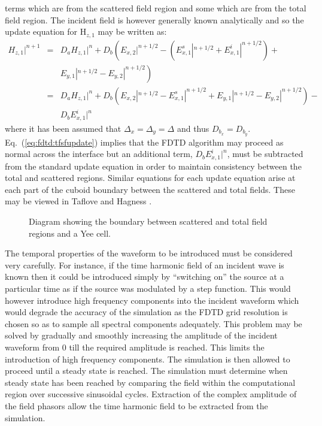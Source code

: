 \documentclass[a4paper, 12pt]{article}
\newcommand{\eq}[1]{Eq.\ (\ref{#1})}
\begin{document}
	terms which are from the scattered field region and some which are
	from the total field region. The incident field is however generally
	known analytically and so the update equation for H$_{z,1}$ may be
	written as:
	\begin{eqnarray}
		H_{z,1}|^{n+1}&=& D_aH_{z,1}|^n+D_b\left(E_{x,2}|^{n+1/2} -
		\left(E_{x,1}^s|^{n+1/2}+E_{x,1}^i|^{n+1/2}\right) + \nonumber\right.\\&&\left.E_{y,1}|^{n+1/2}
		- E_{y,2}|^{n+1/2}\right)\nonumber\\
		&=&D_a H_{z,1}|^n+D_b\left(E_{x,2}|^{n+1/2} -
		E_{x,1}^s|^{n+1/2} + E_{y,1}|^{n+1/2}
		- E_{y,2}|^{n+1/2}\right)-\nonumber\\&&D_bE^i_{x,1}|^n\label{eq:fdtd:tfsfupdate}
	\end{eqnarray}
	where it has been assumed that $\Delta_x=\Delta_y=\Delta$ and thus
	$D_{b_x}=D_{b_y}$. \eq{eq:fdtd:tfsfupdate} implies that the FDTD algorithm may proceed as normal across the
	interface but an additional term, $D_bE^i_{x,1}|^n$, must be
	subtracted from the standard update equation in order to maintain
	consistency between the total and scattered regions. Similar equations
	for each update equation arise at each part of the cuboid boundary
	between the scattered and total fields. These may be viewed in Taflove
	and Hagness \cite{taflove00book}.
	\begin{figure}[!h]
		\centering
		\caption{Diagram showing the boundary between scattered and total
			field regions and a Yee cell.}
		\label{fig:fdtd:tfsfeg}
	\end{figure}
	
	The temporal properties of the waveform to be introduced must be
	considered very carefully. For instance, if the time harmonic field of
	an incident wave is known then it could be introduced simply by
	``switching on'' the source at a particular time as if the source was
	modulated by a step function. This would however introduce high
	frequency components into the incident waveform which would degrade
	the accuracy of the simulation as the FDTD grid resolution is chosen
	so as to sample all spectral components adequately. This problem may
	be solved by gradually and smoothly increasing the amplitude of the
	incident waveform from 0 till the required amplitude is reached. This
	limits the introduction of high frequency components. The simulation is then
	allowed to proceed until a steady state is reached. The simulation
	must determine when steady state has been reached by comparing the
	field within the computational region over successive sinusoidal
	cycles. Extraction of the complex amplitude of the field phasors allow
	the time harmonic field to be extracted from the simulation.
	
\end{document}
